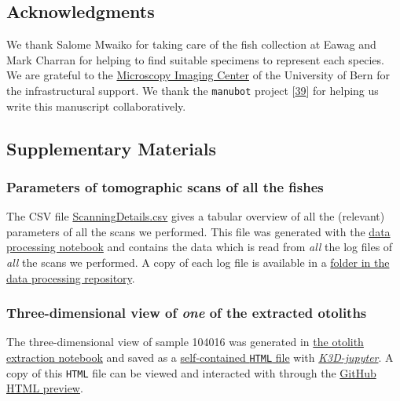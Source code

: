 \hypertarget{acknowledgments}{%
\subsection{Acknowledgments}\label{acknowledgments}}

We thank Salome Mwaiko for taking care of the fish collection at Eawag and Mark Charran for helping to find suitable specimens to represent each species.
We are grateful to the \href{https//www.mic.unibe.ch/}{Microscopy Imaging Center} of the University of Bern for the infrastructural support.
We thank the \texttt{manubot} project {[}\protect\hyperlink{ref-YuJbg3zO}{39}{]} for helping us write this manuscript collaboratively.

\hypertarget{supplementary-materials}{%
\subsection{Supplementary Materials}\label{supplementary-materials}}

\hypertarget{parameters-of-tomographic-scans-of-all-the-fishes}{%
\subsubsection{Parameters of tomographic scans of all the fishes}\label{parameters-of-tomographic-scans-of-all-the-fishes}}

The CSV file \href{https://github.com/habi/EAWAG-manuscript/blob/main/content/data/ScanningDetails.csv}{ScanningDetails.csv} gives a tabular overview of all the (relevant) parameters of all the scans we performed.
This file was generated with the \href{https://github.com/habi/EAWAG/blob/main/DataWrangling.ipynb}{data processing notebook} and contains the data which is read from \emph{all} the log files of \emph{all} the scans we performed.
A copy of each log file is available in a \href{https://github.com/habi/EAWAG/tree/main/logfiles}{folder in the data processing repository}.

\hypertarget{three-dimensional-view-of-one-of-the-extracted-otoliths}{%
\subsubsection{\texorpdfstring{Three-dimensional view of \emph{one} of the extracted otoliths}{Three-dimensional view of one of the extracted otoliths}}\label{three-dimensional-view-of-one-of-the-extracted-otoliths}}

The three-dimensional view of sample 104016 was generated in \href{https://github.com/habi/EAWAG/blob/main/ExtractOtoliths.ipynb}{the otolith extraction notebook} and saved as a \href{https://github.com/habi/EAWAG-manuscript/blob/main/content/data/104016.head.rec.otolith.region.3D.html}{self-contained \texttt{HTML} file} with \href{https://github.com/K3D-tools/K3D-jupyter}{\emph{K3D-jupyter}}.
A copy of this \texttt{HTML} file can be viewed and interacted with through the \href{https://htmlpreview.github.io/?https://github.com/habi/EAWAG-manuscript/blob/main/content/data/104016_Enterochromis_I_cinctus_St_E.head.rec.Otolith.Region.3D.html}{GitHub HTML preview}.

